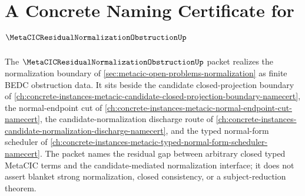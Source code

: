 \chapter{A Concrete Naming Certificate for $\MetaCICResidualNormalizationObstructionUp$}
\label{ch:concrete-instances-metacic-residual-normalization-obstruction-namecert}

The $\MetaCICResidualNormalizationObstructionUp$ packet realizes the normalization boundary of \autoref{sec:metacic-open-problems-normalization} as finite BEDC obstruction data. It sits beside the candidate closed-projection boundary of \autoref{ch:concrete-instances-metacic-candidate-closed-projection-boundary-namecert}, the normal-endpoint cut of \autoref{ch:concrete-instances-metacic-normal-endpoint-cut-namecert}, the candidate-normalization discharge route of \autoref{ch:concrete-instances-candidate-normalization-discharge-namecert}, and the typed normal-form scheduler of \autoref{ch:concrete-instances-metacic-typed-normal-form-scheduler-namecert}. The packet names the residual gap between arbitrary closed typed MetaCIC terms and the candidate-mediated normalization interface; it does not assert blanket strong normalization, closed consistency, or a subject-reduction theorem.

